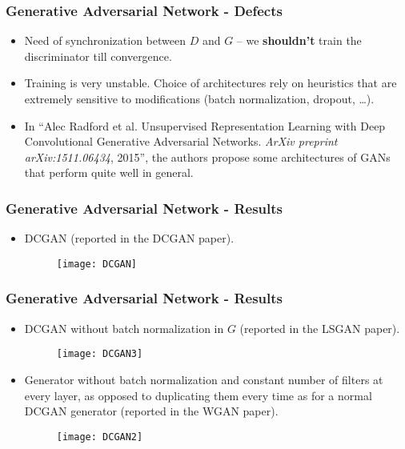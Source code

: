 \begin{frame}
  \frametitle{Generative Adversarial Network - Defects}
  \begin{itemize}
    \item Need of synchronization between $D$ and $G$ -- we
      \textbf{shouldn't} train the discriminator till convergence. 
    \item Training is very unstable. Choice of architectures rely on
      heuristics that are extremely sensitive to modifications (batch
      normalization, dropout, \dots).
    \item In ``Alec Radford et al. Unsupervised Representation Learning
      with Deep Convolutional Generative Adversarial Networks.
      \textit{ArXiv preprint arXiv:1511.06434}, 2015'', the authors propose
      some architectures of GANs that perform quite well in general.
  \end{itemize}
\end{frame}

\begin{frame}
  \frametitle{Generative Adversarial Network - Results}
  \begin{itemize}
    \item DCGAN (reported in the DCGAN paper).
      \begin{figure}
        \texttt{[image: DCGAN]}
      \end{figure}
  \end{itemize}
\end{frame}

\begin{frame}
  \frametitle{Generative Adversarial Network - Results}
  \begin{itemize}
    \item DCGAN without batch normalization in $G$
      (reported in the LSGAN paper).
      \begin{figure}
        \texttt{[image: DCGAN3]}
      \end{figure}
    \item Generator without batch normalization and constant number of filters
      at every layer, as opposed to duplicating them every time as for a normal
      DCGAN generator (reported in the WGAN paper).
      \begin{figure}
        \texttt{[image: DCGAN2]}
      \end{figure}
  \end{itemize}
\end{frame}

